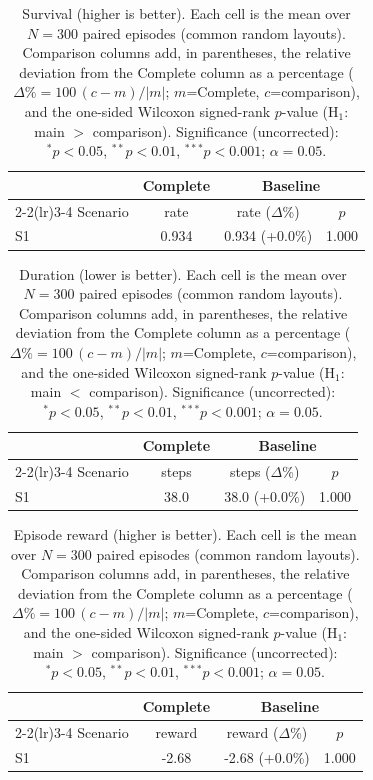 \begin{table}[ht]
  \centering
  \caption{Survival (higher is better). Each cell is the mean over $N=300$ paired episodes (common random layouts). Comparison columns add, in parentheses, the relative deviation from the Complete column as a percentage ($\Delta\%=100\,(c-m)/|m|$; $m$=Complete, $c$=comparison), and the one-sided Wilcoxon signed-rank $p$-value (H$_1$: main $>$ comparison). Significance (uncorrected): $^{*}p<0.05$, $^{**}p<0.01$, $^{***}p<0.001$; $\alpha=0.05$.}
  \label{tab:wilcoxon-survival}
  \small
  \begin{tabular}{l c cc}
    \toprule
     & Complete & \multicolumn{2}{c}{Baseline} \\
    \cmidrule(lr){2-2}\cmidrule(lr){3-4}
    Scenario & {rate} & {rate ($\Delta$\%)} & {$p$} \\
    \midrule
    S1 & 0.934 & 0.934 (+0.0\%) & 1.000 \\
    \bottomrule
  \end{tabular}
\end{table}

\begin{table}[ht]
  \centering
  \caption{Duration (lower is better). Each cell is the mean over $N=300$ paired episodes (common random layouts). Comparison columns add, in parentheses, the relative deviation from the Complete column as a percentage ($\Delta\%=100\,(c-m)/|m|$; $m$=Complete, $c$=comparison), and the one-sided Wilcoxon signed-rank $p$-value (H$_1$: main $<$ comparison). Significance (uncorrected): $^{*}p<0.05$, $^{**}p<0.01$, $^{***}p<0.001$; $\alpha=0.05$.}
  \label{tab:wilcoxon-duration}
  \small
  \begin{tabular}{l c cc}
    \toprule
     & Complete & \multicolumn{2}{c}{Baseline} \\
    \cmidrule(lr){2-2}\cmidrule(lr){3-4}
    Scenario & {steps} & {steps ($\Delta$\%)} & {$p$} \\
    \midrule
    S1 & 38.0 & 38.0 (+0.0\%) & 1.000 \\
    \bottomrule
  \end{tabular}
\end{table}

\begin{table}[ht]
  \centering
  \caption{Episode reward (higher is better). Each cell is the mean over $N=300$ paired episodes (common random layouts). Comparison columns add, in parentheses, the relative deviation from the Complete column as a percentage ($\Delta\%=100\,(c-m)/|m|$; $m$=Complete, $c$=comparison), and the one-sided Wilcoxon signed-rank $p$-value (H$_1$: main $>$ comparison). Significance (uncorrected): $^{*}p<0.05$, $^{**}p<0.01$, $^{***}p<0.001$; $\alpha=0.05$.}
  \label{tab:wilcoxon-reward}
  \small
  \begin{tabular}{l c cc}
    \toprule
     & Complete & \multicolumn{2}{c}{Baseline} \\
    \cmidrule(lr){2-2}\cmidrule(lr){3-4}
    Scenario & {reward} & {reward ($\Delta$\%)} & {$p$} \\
    \midrule
    S1 & -2.68 & -2.68 (+0.0\%) & 1.000 \\
    \bottomrule
  \end{tabular}
\end{table}
